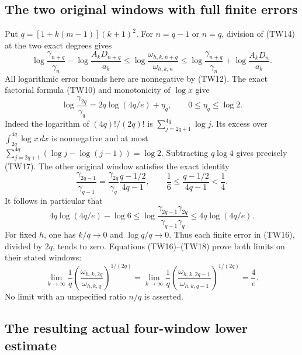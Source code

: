 \subsection{The two original windows with full finite errors}

Put $q=[1+k(m-1)](k+1)^2$.  For $n=q-1$ or $n=q$, division of
(TW14) at the two exact degrees gives
\[
 \log\frac{\gamma_{n+q}}{\gamma_n}
       -\log\frac{A_kD_{n+q}}{a_k}
 \leq\log\frac{\omega_{h,k,n+q}}{\omega_{h,k,n}}
 \leq\log\frac{\gamma_{n+q}}{\gamma_n}
       +\log\frac{A_kD_n}{a_k}.
 \tag{TW16}
\]
All logarithmic error bounds here are nonnegative by (TW12).
The exact factorial formula (TW10) and monotonicity of $\log x$ give
\[
 \log\frac{\gamma_{2q}}{\gamma_q}
 =2q\log(4q/e)+\eta_q,\qquad 0\leq\eta_q\leq\log2.
 \tag{TW17}
\]
Indeed the logarithm of $(4q)!/(2q)!$ is
$\sum_{j=2q+1}^{4q}\log j$.  Its excess over
$\int_{2q}^{4q}\log x\,dx$ is nonnegative and at most
$\sum_{j=2q+1}^{4q}(\log j-\log(j-1))=\log2$.
Subtracting $q\log4$ gives precisely (TW17).
The other original window satisfies the exact identity
\[
 \frac{\gamma_{2q-1}}{\gamma_{q-1}}
 =\frac{\gamma_{2q}}{\gamma_q}\frac{q-1/2}{4q-1},
 \qquad \frac16\leq\frac{q-1/2}{4q-1}<\frac14.
\]
It follows in particular that
\[
 4q\log(4q/e)-\log6
 \leq\log\frac{\gamma_{2q-1}\gamma_{2q}}
                    {\gamma_{q-1}\gamma_q}
 \leq4q\log(4q/e).
 \tag{TW18}
\]
For fixed $h$, one has $k/q\to0$ and $\log q/q\to0$.
Thus each finite error in (TW16), divided by $2q$, tends to zero.
Equations (TW16)--(TW18) prove both limits on their stated windows:
\[
 \boxed{
 \lim_{k\to\infty}\frac1q
 \left(\frac{\omega_{h,k,2q}}{\omega_{h,k,q}}\right)^{1/(2q)}
 =\lim_{k\to\infty}\frac1q
 \left(\frac{\omega_{h,k,2q-1}}{\omega_{h,k,q-1}}\right)^{1/(2q)}
 =\frac4e.}\tag{TW19}
\]
No limit with an unspecified ratio $n/q$ is asserted.

\subsection{The resulting actual four-window lower estimate}

